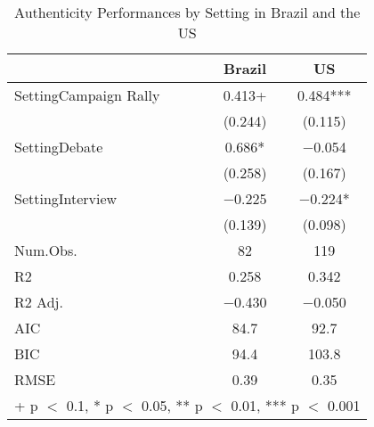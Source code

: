 \documentclass[
  12pt,
]{article}
\begin{document}
\begin{table}

\caption{\label{tab:table 6}Authenticity Performances by Setting in Brazil and the US}
\centering
\begin{tabular}[t]{lcc}
\toprule
  & Brazil & US\\
\midrule
SettingCampaign Rally & \num{0.413}+ & \num{0.484}***\\
 & (\num{0.244}) & (\num{0.115})\\
SettingDebate & \num{0.686}* & \num{-0.054}\\
 & (\num{0.258}) & (\num{0.167})\\
SettingInterview & \num{-0.225} & \num{-0.224}*\\
 & (\num{0.139}) & (\num{0.098})\\
\midrule
Num.Obs. & \num{82} & \num{119}\\
R2 & \num{0.258} & \num{0.342}\\
R2 Adj. & \num{-0.430} & \num{-0.050}\\
AIC & \num{84.7} & \num{92.7}\\
BIC & \num{94.4} & \num{103.8}\\
RMSE & \num{0.39} & \num{0.35}\\
\bottomrule
\multicolumn{3}{l}{\rule{0pt}{1em}+ p $<$ 0.1, * p $<$ 0.05, ** p $<$ 0.01, *** p $<$ 0.001}\\
\end{tabular}
\end{table}
\end{document}
